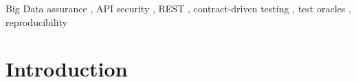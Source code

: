 \documentclass[
]{ceurart}
\begin{document}
\begin{keywords}
  Big Data assurance \sep
  API security \sep
  REST \sep
  contract-driven testing \sep
  test oracles \sep
  reproducibility
\end{keywords}

\maketitle

\section{Introduction}
\end{document}

